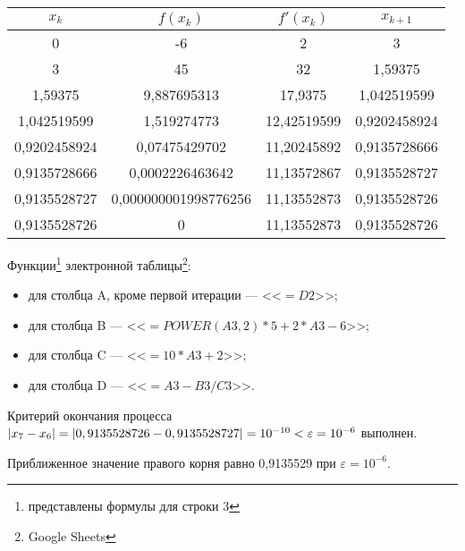 \documentclass[10pt, a4paper, titlepage]{article}
\newcommand*{\hm}[1]{#1\nobreak\discretionary{}{\hbox{$\mathsurround=0pt #1$}}{}} %
\begin{document}
\begin{center}
    \begin{tabular}{|c|c|c|c|}
        \hline
        $x_k$ & $f(x_k)$ & $f'(x_k)$ & $x_{k+1}$ \\ \hline
        
        0 & -6 & 2 & 3 \\ \hline
        
        3 &	45 & 32 & 1,59375 \\ \hline
        
        1,59375	& 9,887695313 &	17,9375 & 1,042519599 \\ \hline
        
        1,042519599 & 1,519274773 & 12,42519599 & 0,9202458924 \\ \hline
        
        0,9202458924 & 0,07475429702 & 11,20245892 & 0,9135728666 \\ \hline
        
        0,9135728666 & 0,0002226463642 & 11,13572867 & 0,9135528727 \\ \hline
        
        0,9135528727 & 0,000000001998776256	& 11,13552873 & 0,9135528726 \\ \hline
        
        0,9135528726 & 0 & 11,13552873 & 0,9135528726 \\ \hline
        
    \end{tabular}
\end{center}

Функции\footnote{представлены формулы для строки 3} электронной таблицы\footnote{Google Sheets}:
\begin{itemize}
    \item для столбца A, кроме первой итерации --- <<$=D2$>>;
    
    \item для столбца B --- <<$=POWER(A3, 2)*5+2*A3-6$>>;
    
    \item для столбца C --- <<$=10*A3+2$>>;
    
    \item для столбца D --- <<$=A3-B3/C3$>>.
\end{itemize}

Критерий окончания процесса $|x_7-x_6|=|0,9135528726-0,9135528727| \hm =10^{-10}<\varepsilon=10^{-6}$ выполнен. 

Приближенное значение правого корня равно 0,9135529 при $\varepsilon=10^{-6}$.
\end{document}
